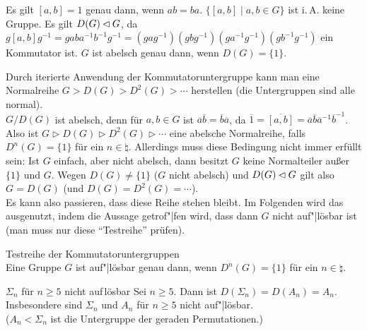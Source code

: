\begin{Bem}
    Es gilt $[a, b] = 1$ genau dann, wenn $ab = ba$.
    $\{[a, b] \;|\; a, b \in G\}$ ist i.\,A. keine Gruppe.
    Es gilt $D(G) \mathbin{\vartriangleleft} G$, da
    $g [a,b] g^{-1} = gaba^{-1}b^{-1}g^{-1} =
    (gag^{-1})(gbg^{-1})(ga^{-1}g^{-1})(gb^{-1}g^{-1})$ ein Kommutator ist.
    $G$ ist abelsch genau dann, wenn $D(G) = \{1\}$.
\end{Bem}

\begin{Bem}
    Durch iterierte Anwendung der Kommutatoruntergruppe kann man
    eine Normalreihe $G > D(G) > D^2(G) > \dotsb$ herstellen
    (die Untergruppen sind alle normal).\\
    $G/D(G)$ ist abelsch, denn für $a, b \in G$ ist
    $\overline{a} \overline{b} = \overline{b} \overline{a}$,
    da $\overline{1} = \overline{[a,b]} =
    \overline{a}\overline{b}\overline{a}^{-1}\overline{b}^{-1}$.\\
    Also ist $G \vartriangleright D(G) \vartriangleright
    D^2(G) \vartriangleright \dotsb$ eine abelsche Normalreihe, falls
    $D^n(G) = \{1\}$ für ein $n \in \natural$.
    Allerdings muss diese Bedingung nicht immer erfüllt sein:
    Ist $G$ einfach, aber nicht abelsch, dann besitzt $G$ keine Normalteiler
    außer $\{1\}$ und $G$.
    Wegen $D(G) \not= \{1\}$ ($G$ nicht abelsch) und $D(G) \mathbin{\vartriangleleft} G$ gilt
    also $G = D(G)$ (und $D(G) = D^2(G) = \dotsb$).\\
    Es kann also passieren, dass diese Reihe stehen bleibt.
    Im Folgenden wird das ausgenutzt, indem die Aussage getrof"|fen wird,
    dass dann $G$ nicht auf"|lösbar ist
    (man muss nur diese "`Testreihe"' prüfen).
\end{Bem}

\begin{Prop}{Testreihe der Kommutatoruntergruppen}\\
    Eine Gruppe $G$ ist auf"|lösbar genau dann, wenn
    $D^n(G) = \{1\}$ für ein $n \in \natural$.
\end{Prop}

\begin{Prop}{$\Sigma_n$ für $n \ge 5$ nicht auf\,\!lösbar}
    Sei $n \ge 5$.
    Dann ist $D(\Sigma_n) = D(A_n) = A_n$.\\
    Insbesondere sind $\Sigma_n$ und $A_n$ für $n \ge 5$
    nicht auf"|lösbar.\\
    ($A_n < \Sigma_n$ ist die Untergruppe der geraden Permutationen.)
\end{Prop}


